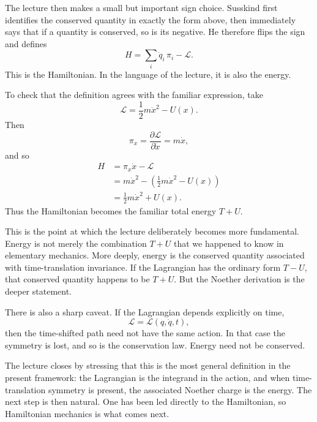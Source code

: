 The lecture then makes a small but important sign choice. Susskind first identifies the conserved quantity in exactly the form above, then immediately says that if a quantity is conserved, so is its negative. He therefore flips the sign and defines
\begin{equation}
H=\sum_i \dot q_i\,\pi_i-\mathcal{L}.
\end{equation}
This is the Hamiltonian. In the language of the lecture, it is also the energy.

To check that the definition agrees with the familiar expression, take
\begin{equation}
\mathcal{L}=\frac{1}{2}m\dot x^2-U(x).
\end{equation}
Then
\begin{equation}
\pi_x=\frac{\partial \mathcal{L}}{\partial \dot x}=m\dot x,
\end{equation}
and so
\begin{align}
H
&=
\pi_x\dot x-\mathcal{L} \\
&=
m\dot x^2-\left(\frac{1}{2}m\dot x^2-U(x)\right) \\
&=
\frac{1}{2}m\dot x^2+U(x).
\end{align}
Thus the Hamiltonian becomes the familiar total energy \(T+U\).

This is the point at which the lecture deliberately becomes more fundamental. Energy is not merely the combination \(T+U\) that we happened to know in elementary mechanics. More deeply, energy is the conserved quantity associated with time-translation invariance. If the Lagrangian has the ordinary form \(T-U\), that conserved quantity happens to be \(T+U\). But the Noether derivation is the deeper statement.

There is also a sharp caveat. If the Lagrangian depends explicitly on time,
\begin{equation}
\mathcal{L}=\mathcal{L}(q,\dot q,t),
\end{equation}
then the time-shifted path need not have the same action. In that case the symmetry is lost, and so is the conservation law. Energy need not be conserved.

The lecture closes by stressing that this is the most general definition in the present framework: the Lagrangian is the integrand in the action, and when time-translation symmetry is present, the associated Noether charge is the energy. The next step is then natural. One has been led directly to the Hamiltonian, so Hamiltonian mechanics is what comes next.

